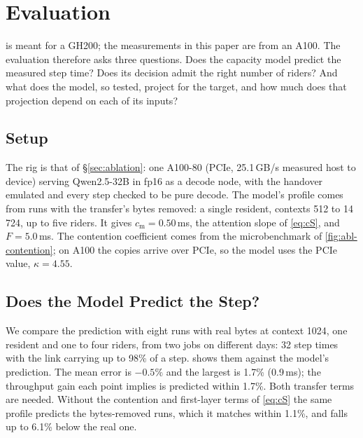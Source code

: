 
\section{Evaluation}\label{sec:eval}

\sysname{} is meant for a GH200; the measurements in this paper are from an
A100. The evaluation therefore asks three questions. Does the capacity model
predict the measured step time? Does its decision admit the right number of
riders? And what does the model, so
tested, project for the target, and how much does that projection depend on
each of its inputs?

\subsection{Setup}

The rig is that of \S\ref{sec:ablation}: one A100-80 (PCIe, 25.1\,GB/s measured
host to device) serving Qwen2.5-32B in fp16 as a decode node, with the
handover emulated and every step checked to be pure decode. The model's
profile comes from runs with the transfer's bytes removed: a single resident,
contexts 512 to 14\,724, up to five riders. It gives
$c_{\mathrm{m}} = 0.50$\,ms, the attention slope of \cref{eq:cS}, and
$F = 5.0$\,ms. The contention coefficient comes from the microbenchmark of
\cref{fig:abl-contention}; on A100 the copies arrive over PCIe, so the model
uses the PCIe value, $\kappa = 4.55$.



\subsection{Does the Model Predict the Step?}\label{sec:eval-pred}

We compare the prediction with eight runs with real bytes at context 1024,
one resident and one to four riders, from two jobs on different days: 32 step
times with the link carrying up to 98\% of a step.  shows them against
the model's prediction. The mean error is $-0.5\%$ and the largest is 1.7\%
(0.9\,ms); the throughput gain each point implies is predicted within 1.7\%.
Both transfer terms are needed. Without the contention and first-layer terms
of \cref{eq:cS} the same profile predicts the bytes-removed runs, which it
matches within 1.1\%, and falls up to 6.1\% below the real one.

